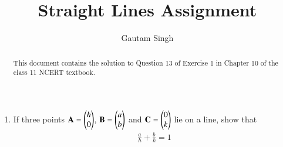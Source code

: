 \documentclass[journal,12pt,twocolumn]{IEEEtran}
\let\vec\mathbf
\begin{document}
\vspace{3cm}
\title{Straight Lines Assignment}
\author{Gautam Singh}
\maketitle
\bigskip

\begin{abstract}
    This document contains the solution to Question 13 of Exercise 1 in Chapter
    10 of the class 11 NCERT textbook.
\end{abstract}

\begin{enumerate}
    \item If three points $\vec{A} = \myvec{h\\0}$, $\vec{B} = \myvec{a\\b}$ 
    and $\vec{C} = \myvec{0\\k}$ lie on a line, show that
    \begin{align}
        \frac{a}{h} + \frac{b}{k} = 1
        \label{eq:line-intercept}
    \end{align}


\end{enumerate}
\end{document}
